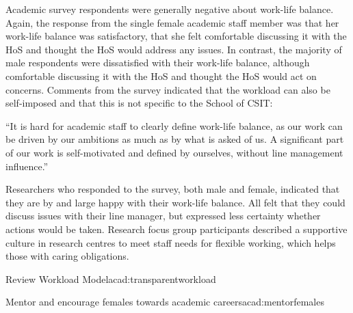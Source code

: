 Academic survey respondents were generally negative about work-life balance. Again, the response from the single female academic staff member was that her work-life balance was satisfactory, that she felt comfortable discussing it with the HoS and thought the HoS would address any issues. In contrast, the majority of male respondents were dissatisfied with their work-life balance, although comfortable discussing it with the HoS and thought the HoS would act on concerns. Comments from the survey indicated that the workload can also be self-imposed and that this is not specific to the School of CSIT:

\begin{myquote}
``It is hard for academic staff to clearly define work-life balance, as our work can be driven by our ambitions as much as by what is asked of us. A significant part of our work is self-motivated and defined by ourselves, without line management influence.''
\end{myquote}


Researchers who responded to the survey, both male and female, indicated that they are by and large happy with their work-life balance. All felt that they could discuss issues with their line manager, but expressed less certainty whether actions would be taken. Research focus group participants described a supportive culture in research centres to meet staff needs for flexible working, which helps those with caring obligations. 



\begin{actionblock}{\ksspace{}Review Workload Model}{acad:transparentworkload}
\actreviewworkloadmodel
\hfill{
    \hypersetup{hidelinks}
    \hyperlink{c19}{\gotoactionsymbol{}}
}
\end{actionblock}


\begin{actionblock}{\ksspace{}Mentor and encourage females towards academic careers}{acad:mentorfemales}
\actmentorfemales
\hfill{
    \hypersetup{hidelinks}
    \hyperlink{c20}{\gotoactionsymbol{}}
}
\end{actionblock}



